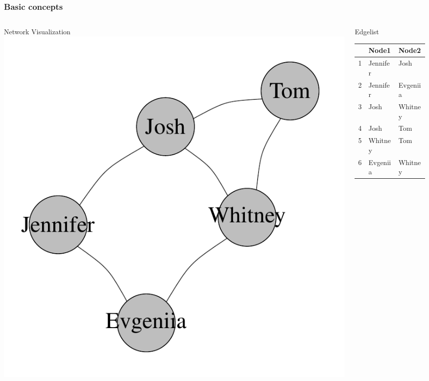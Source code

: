\documentclass{beamer}
\begin{document}
\begin{frame}
	\frametitle{Basic concepts}
	
	\begin{columns}[T]
		\begin{column}{0.5\textwidth}
			\alert{Network Visualization}\\
			\includegraphics[width=1\textwidth]{figures/network-example.pdf}
		\end{column}
		\begin{column}{0.5\textwidth}
			\alert{Edgelist}\\
			\vspace{.50cm}
			\begin{tabular}{rll}
				\hline
				& Node1 & Node2 \\ 
				\hline
				1 & Jennifer & Josh \\ 
				2 & Jennifer & Evgeniia \\ 
				3 & Josh & Whitney \\ 
				4 & Josh & Tom \\ 
				5 & Whitney & Tom \\ 
				6 & Evgeniia & Whitney \\ 
				\hline
			\end{tabular}
		\end{column}
	\end{columns}
\end{frame}
\end{document}

